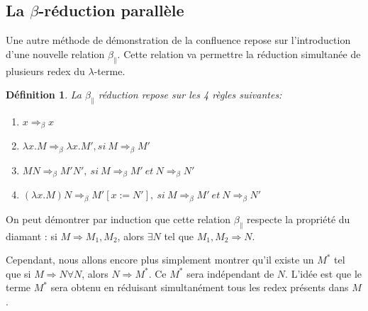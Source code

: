 \documentclass[11pt]{book}
\newtheorem{definition}{Définition}
\begin{document}
\subsection{La $\beta$-réduction parallèle}
Une autre méthode de démonstration de la confluence repose sur l'introduction d'une nouvelle relation $\beta _\parallel $.
Cette relation va permettre la réduction simultanée de plusieurs redex du $\lambda$-terme.

\begin{definition}
	La $\beta _\parallel$ réduction repose sur les 4 règles suivantes:
	\begin{enumerate}
		\item  
		$ x \Rightarrow_\beta  x $
		\item 
		$ \lambda x.M \Rightarrow_\beta  \lambda x.M' , si\ M \Rightarrow_\beta  M' $
		\item 
		$ MN \Rightarrow_\beta  M' N' , \ si\ M  \Rightarrow_\beta  M' 
		                                               \ et\ N  \Rightarrow_\beta  N'$
		\item 
		$ (\lambda x.M)N \Rightarrow_\beta M'[x:=N'] , \ si\ M \Rightarrow_\beta  M' 
		                                               \ et\ N  \Rightarrow_\beta N'$
	\end{enumerate}

\end{definition}
On peut démontrer par induction que cette relation $\beta _\parallel$ respecte la propriété du diamant : si
$M \Rightarrow M_1,M_2$, alors $\exists N$ tel que $M_1,M_2  \Rightarrow N$.

Cependant, nous allons encore plus simplement montrer qu'il existe un $M^*$ tel que si $M  \Rightarrow N  \forall N$, alors
$N  \Rightarrow M^*$. Ce $M^*$ sera indépendant de $N$.
L'idée est que le terme $M^*$ sera obtenu en réduisant simultanément tous les redex présents dans $M$.
\end{document}
